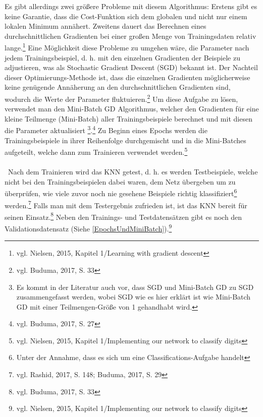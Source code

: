 \documentclass[a4paper,12pt,ngerman,oneside]{scrreprt}	%
\newcommand{\fundamentals}[1]{vgl. Buduma, 2017, S. {#1}}
\begin{document}
			Es gibt allerdings zwei größere Probleme mit diesem Algorithmus: Erstens gibt es keine Garantie, dass die Cost-Funktion sich dem globalen und nicht nur einem lokalen Minimum annähert. Zweitens dauert das Berechnen eines durchschnittlichen Gradienten bei einer großen Menge von Trainingsdaten relativ lange.\footnote{vgl. Nielsen, 2015, Kapitel 1/Learning with gradient descent} Eine Möglichkeit diese Probleme zu umgehen wäre, die Parameter nach jedem Trainingsbeispiel, d. h. mit den einzelnen Gradienten der Beispiele zu adjustieren, was als Stochastic Gradient Descent (SGD) bekannt ist. Der Nachteil dieser Optimierungs-Methode ist, dass die einzelnen Gradienten möglicherweise keine genügende Annäherung an den durchschnittlichen Gradienten sind, wodurch die Werte der Parameter fluktuieren.\footnote{\fundamentals{33}} Um diese Aufgabe zu lösen, verwendet man den Mini-Batch GD Algorithmus, welcher den Gradienten für eine kleine Teilmenge (Mini-Batch) aller Trainingsbeispiele berechnet und mit diesen die Parameter aktualisiert%
			\footnote{Es kommt in der Literatur auch vor, dass SGD und Mini-Batch GD zu SGD zusammengefasst werden, wobei SGD wie es hier erklärt ist wie Mini-Batch GD mit einer Teilmengen-Größe von 1 gehandhabt wird.}.\footnote{\fundamentals{27}} Zu Beginn eines Epochs werden die Trainingsbeispiele in ihrer Reihenfolge durchgemischt und in die Mini-Batches aufgeteilt, welche dann zum Trainieren verwendet werden.\footnote{vgl. Nielsen, 2015, Kapitel 1/Implementing our network to classify digits}
			\\\
			\\\
			Nach dem Trainieren wird das KNN getest, d. h. es werden Testbeispiele, welche nicht bei den Trainingsbeispielen dabei waren, dem Netz übergeben um zu überprüfen, wie viele zuvor noch nie gesehene Beispiele richtig klassifiziert\footnote{Unter der Annahme, dass es sich um eine Classifications-Aufgabe handelt} werden.\footnote{vgl. Rashid, 2017, S. 148; Buduma, 2017, S. 29} Falls man mit dem Testergebnis zufrieden ist, ist das KNN bereit für seinen Einsatz.\footnote{\fundamentals{33}} Neben den Trainings- und Testdatensätzen gibt es noch den Validationsdatensatz (Siehe \ref{EpochsUndMiniBatch}).\footnote{vgl. Nielsen, 2015, Kapitel 1/Implementing our network to classify digits}
		
\end{document}
